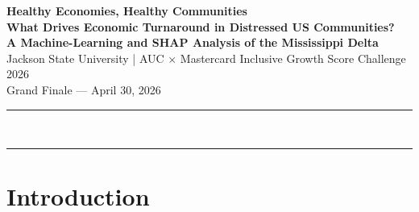 \documentclass[10pt, letterpaper]{article}
\newcommand{\igs}{\textsc{igs}}
\begin{document}

{%
  \centering
  {\fontsize{15}{18}\bfseries\color{mcblue}
    Healthy Economies, Healthy Communities\\[4pt]}
  {\fontsize{11}{14}\bfseries
    What Drives Economic Turnaround in Distressed US Communities?\\
    A Machine-Learning and SHAP Analysis of the Mississippi Delta\\[8pt]}
  {\normalsize
    Jackson State University \quad|\quad
    AUC × Mastercard Inclusive Growth Score Challenge 2026\\[4pt]}
  {\small\textcolor{midgray}{Grand Finale — April 30, 2026}}\\[12pt]
  \rule{\textwidth}{0.4pt}\\[8pt]
}

\begin{abstract}
\noindent
Among the \textbf{25,142} US census tracts that fell below an Inclusive
Growth Score (\igs{}) of 45 in 2017, only \textbf{34\%} managed to
cross that threshold by 2025.  We train a three-model machine-learning
ensemble—Logistic Regression, Random Forest, and Gradient
Boosting—on 89 granular features drawn from 10 public datasets,
then apply TreeSHAP to identify the precise drivers of
community recovery.  Our central finding is that \textbf{chronic
disease burden} (dental-visit rates, preventive screenings),
\textbf{commercial ecosystem diversity}, and \textbf{broadband
connectivity} are the strongest predictors of turnaround—not aggregate
healthcare counts or composite index scores.  We operationalise these
findings as an \emph{Investment Priority Matrix} that maps every
feature to an actionable quadrant (Act Now / Protect / Second Wave /
Monitor) for each of the nine Mississippi Delta counties.  All data,
models, and an interactive Streamlit dashboard are publicly available.
\end{abstract}

\rule{\textwidth}{0.4pt}
\vspace{6pt}

\section{Introduction}
\end{document}
